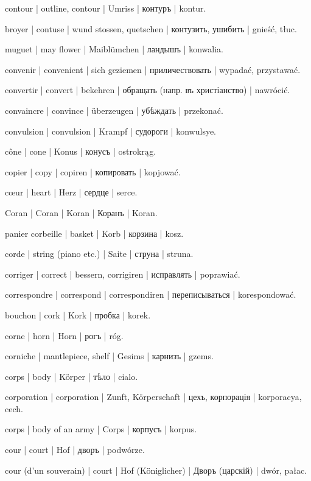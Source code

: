 \begin{outdent}{1em}
contour | outline, contour | Umriss | контуръ | kontur.

broyer | contuse | wund stossen, quetschen | контузить,
ушибить | gnieść, tłuc.

muguet | may flower | Maiblümchen | ландышъ | konwalia.

convenir | convenient | sich geziemen | приличествовать | wypadać, przystawać.

convertir | convert | bekehren | обращать (напр. въ
христіанство) | nawrócić.

convaincre | convince | überzeugen | убѣждать | przekonać.

convulsion | convulsion | Krampf | судороги | konwulsye.

cône | cone | Konus | конусъ | ostrokrąg.

copier | copy | copiren | копировать | kopjować.

cœur | heart | Herz | сердце | serce.

Coran | Coran | Koran | Коранъ | Koran.

panier corbeille | basket | Korb | корзина | kosz.

corde | string (piano etc.) | Saite | струна | struna.

corriger | correct | bessern, corrigiren | исправлять | poprawiać.

correspondre | correspond | correspondiren | переписываться | korespondować.

bouchon | cork | Kork | пробка | korek.

corne | horn | Horn | рогъ | róg.

corniche | mantlepiece, shelf | Gesims | карнизъ | gzems.

corps | body | Körper | тѣло | cialo.

corporation | corporation | Zunft, Körperschaft | цехъ, корпорація | korporacya, cech.

corps | body of an army | Corps | корпусъ | korpus.

cour | court | Hof | дворъ | podwórze.

\uvsubentry{}
cour (d’un souverain) | court | Hof (Königlicher) | Дворъ (царскій) | dwór, pałac.


\end{outdent}
